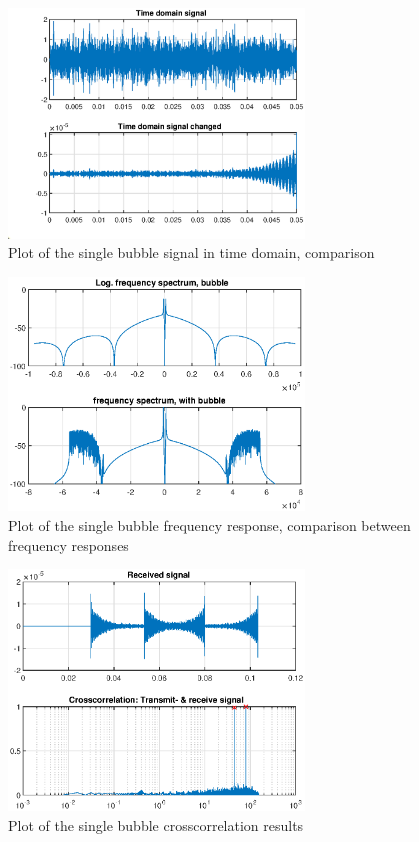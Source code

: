 \documentclass[11pt]{article}
\begin{document}
\begin{figure} [H]
    \centering
    \includegraphics[width=0.7\textwidth]{figures/single-bubble_time_signal_comp.eps}
    \caption{Plot of the single bubble signal in time domain, comparison}
    \label{fig:single-bubble_time_signal_comp.}
\end{figure}

\begin{figure} [H]
    \centering
    \includegraphics[width=0.7\textwidth]{figures/single-bubble_freq_signal_comp.eps}
    \caption{Plot of the single bubble frequency response, comparison between frequency responses}
    \label{fig:single-bubble_freq_signal_comp}
\end{figure}

\begin{figure} [H]
    \centering
    \includegraphics[width=0.7\textwidth]{figures/single-bubble_received-sign_crosscorr.eps}
    \caption{Plot of the single bubble crosscorrelation results}
    \label{fig:single-bubble_received-sign_crosscorr}
\end{figure}
\end{document}
